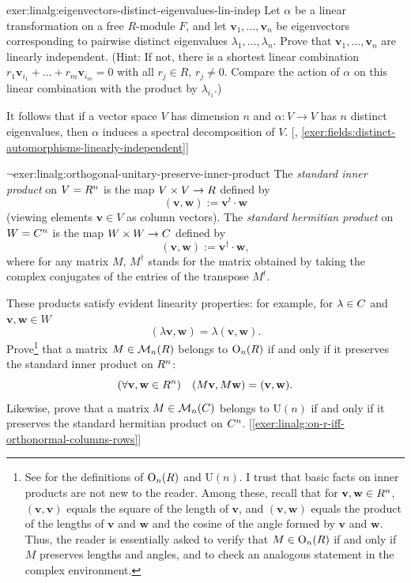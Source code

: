 \begin{exer}{\exerused}{exer:linalg:eigenvectors-distinct-eigenvalues-lin-indep}
  Let $\alpha$ be a linear transformation on a free $R$-module $F$,
  and let $\mathbf{v}_1, \dots, \mathbf{v}_n$ be eigenvectors
  corresponding to pairwise distinct eigenvalues
  $\lambda_1, \dots, \lambda_n$. Prove that
  $\mathbf{v}_1, \dots, \mathbf{v}_n$ are linearly independent.
  (Hint: If not, there is a shortest linear combination
  $r_1\mathbf{v}_{i_1} + \dots + r_m\mathbf{v}_{i_m} = 0$ with all
  $r_j \in R$, $r_j \neq 0$. Compare the action of $\alpha$ on this
  linear combination with the product by $\lambda_{i_1}$.)

  It follows that if a vector space $V$ has dimension $n$ and
  $\alpha : V \to V$ has $n$ distinct
  eigenvalues, then $\alpha$ induces a spectral decomposition of $V$.
  [,
  \ref{exer:fields:distinct-automorphisms-linearly-independent}]
\end{exer}
\begin{exer}{$\lnot$}{exer:linalg:orthogonal-unitary-preserve-inner-product}
  The \emph{standard inner product} on $V = R^n$ is the map
  $V \times V \to R$ defined by
  \[
    (\mathbf{v}, \mathbf{w}) := \mathbf{v}^t \cdot \mathbf{w}
  \]
  (viewing elements $\mathbf{v} \in V$ as column vectors). The
  \emph{standard hermitian product} on $W = C^n$ is the map
  $W \times W \to C$ defined by
  \[
    (\mathbf{v}, \mathbf{w}) := \mathbf{v}^\dagger \cdot \mathbf{w},
  \]
  where for any matrix $M$, $M^\dagger$ stands for the matrix obtained
  by taking the complex conjugates of the entries of the transpose
  $M^t$.

  These products satisfy evident linearity properties: for example,
  for $\lambda \in C$ and $\mathbf{v}, \mathbf{w} \in W$
  \[
    (\lambda\mathbf{v}, \mathbf{w}) = \lambda(\mathbf{v}, \mathbf{w}).
  \]
  Prove\footnote{See 
    for the definitions of $\mathrm{O}_n(R)$ and $\mathrm{U}(n)$. I
    trust that basic facts on inner products are not new to the
    reader. Among these, recall that for
    $\mathbf{v}, \mathbf{w} \in R^n$, $(\mathbf{v}, \mathbf{v})$
    equals the square of the length of $\mathbf{v}$, and
    $(\mathbf{v}, \mathbf{w})$ equals the product of the lengths of
    $\mathbf{v}$ and $\mathbf{w}$ and the cosine of the angle formed
    by $\mathbf{v}$ and $\mathbf{w}$. Thus, the reader is essentially
    asked to verify that $M \in \mathrm{O}_n(R)$ if and only if $M$
    preserves lengths and angles, and to check an analogous statement
    in the complex environment.} that a matrix
  $M \in \mathcal{M}_n(R)$ belongs to $\mathrm{O}_n(R)$ if and only
  if it preserves the standard inner product on $R^n$:
  \[
    (\forall \mathbf{v}, \mathbf{w} \in R^n) \quad (M\mathbf{v},
    M\mathbf{w}) = (\mathbf{v}, \mathbf{w}).
  \]
  Likewise, prove that a matrix $M \in \mathcal{M}_n(C)$ belongs to
  $\mathrm{U}(n)$ if and only if it preserves the standard hermitian
  product on
  $C^n$. [\ref{exer:linalg:on-r-iff-orthonormal-columns-rows}]
\end{exer}
